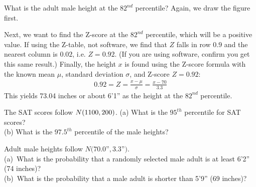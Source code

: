 \begin{examplewrap}
\begin{nexample}{What is the adult male height at the
    $82^{nd}$ percentile?}
  Again, we draw the figure first.\vspace{-3mm}
  \begin{center}
  \vspace{-1mm}
  \end{center}
  Next, we want to find the Z-score at the $82^{nd}$ percentile,
  which will be a positive value.
  If using the Z-table, not software,
  we find that $Z$ falls in row $0.9$
  and the nearest column is $0.02$, i.e. $Z = 0.92$.
  (If you are using software, confirm you get this same result.)
  Finally, the height $x$ is found using the Z-score formula
  with the known mean $\mu$, standard deviation $\sigma$,
  and Z-score $Z = 0.92$:
  \begin{align*}
  0.92 = Z = \frac{x-\mu}{\sigma} = \frac{x - 70}{3.3}
  \end{align*}
  This yields 73.04 inches or about 6'1'' as the height
  at the $82^{nd}$ percentile.
\end{nexample}
\end{examplewrap}

\begin{exercisewrap}
\begin{nexercise}
The SAT scores follow $N(1100{}, 200{})$.
(a) What is the $95^{th}$ percentile for SAT scores? \\
(b) What is the $97.5^{th}$ percentile of the male heights?
\end{nexercise}
\end{exercisewrap}

\begin{exercisewrap}
\begin{nexercise}\label{more74Less69}
Adult male heights follow $N(70.0$''$, 3.3$''$)$. \\
(a)~What is the probability that a randomly selected male
    adult is at least 6'2'' (74 inches)? \\
(b)~What is the probability that a male adult is shorter
    than 5'9'' (69 inches)?\footnotemark{}
\end{nexercise}
\end{exercisewrap}

